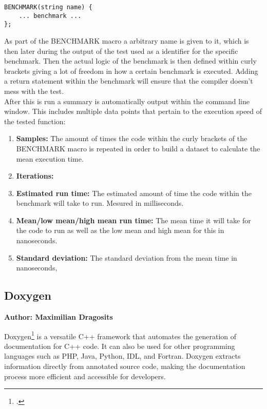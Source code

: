 \begin{verbatim}
BENCHMARK(string name) {
    ... benchmark ...
};
\end{verbatim}

As part of the BENCHMARK macro a arbitrary name is given to it, which is then later during the output of the test used as a identifier for the specific benchmark.
Then the actual logic of the benchmark is then defined within curly brackets giving a lot of freedom in how a certain benchmark is executed. Adding a return statement
within the benchmark will ensure that the compiler doesn't mess with the test.\\
\vspace{\baselineskip}
After this is run a summary is automatically output within the command line window. This includes multiple data points that pertain to the execution speed of the tested
function:
\begin{enumerate}
    \item \textbf{Samples:} The amount of times the code within the curly brackets of the BENCHMARK macro is repeated in order to build a dataset to calculate the mean execution time.
    \item \textbf{Iterations:} %
    \item \textbf{Estimated run time:} The estimated amount of time the code within the benchmark will take to run. Mesured in milliseconds.
    \item \textbf{Mean/low mean/high mean run time:} The mean time it will take for the code to run as well as the low mean and high mean for this in nanoseconds.
    \item \textbf{Standard deviation:} The standard deviation from the mean time in nanoseconds,
\end{enumerate}

\subsection{Doxygen}
\textbf{Author: Maximilian Dragosits}

Doxygen\footcite{doxygen_main_site} is a versatile C++ framework that automates the generation of documentation for C++ code. It can also be used for other programming languages such as 
PHP, Java, Python, IDL, and Fortran. Doxygen extracts information directly from annotated source code, making the documentation process more efficient and 
accessible for developers.\\

